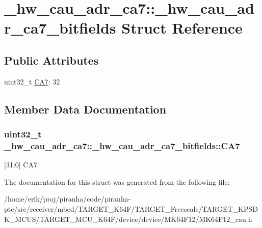 \hypertarget{struct__hw__cau__adr__ca7_1_1__hw__cau__adr__ca7__bitfields}{}\section{\+\_\+hw\+\_\+cau\+\_\+adr\+\_\+ca7\+:\+:\+\_\+hw\+\_\+cau\+\_\+adr\+\_\+ca7\+\_\+bitfields Struct Reference}
\label{struct__hw__cau__adr__ca7_1_1__hw__cau__adr__ca7__bitfields}
\subsection*{Public Attributes}
\begin{DoxyCompactItemize}
\item 
uint32\+\_\+t \hyperlink{struct__hw__cau__adr__ca7_1_1__hw__cau__adr__ca7__bitfields_a19b2b3afaafb951af5d09a3d51599964}{C\+A7}\+: 32
\end{DoxyCompactItemize}


\subsection{Member Data Documentation}
\subsubsection[{\texorpdfstring{C\+A7}{CA7}}]{\setlength{\rightskip}{0pt plus 5cm}uint32\+\_\+t \+\_\+hw\+\_\+cau\+\_\+adr\+\_\+ca7\+::\+\_\+hw\+\_\+cau\+\_\+adr\+\_\+ca7\+\_\+bitfields\+::\+C\+A7}\hypertarget{struct__hw__cau__adr__ca7_1_1__hw__cau__adr__ca7__bitfields_a19b2b3afaafb951af5d09a3d51599964}{}\label{struct__hw__cau__adr__ca7_1_1__hw__cau__adr__ca7__bitfields_a19b2b3afaafb951af5d09a3d51599964}
\mbox{[}31\+:0\mbox{]} C\+A7 

The documentation for this struct was generated from the following file\+:\begin{DoxyCompactItemize}
\item 
/home/erik/proj/piranha/code/piranha-\/ptc/src/receiver/mbed/\+T\+A\+R\+G\+E\+T\+\_\+\+K64\+F/\+T\+A\+R\+G\+E\+T\+\_\+\+Freescale/\+T\+A\+R\+G\+E\+T\+\_\+\+K\+P\+S\+D\+K\+\_\+\+M\+C\+U\+S/\+T\+A\+R\+G\+E\+T\+\_\+\+M\+C\+U\+\_\+\+K64\+F/device/device/\+M\+K64\+F12/M\+K64\+F12\+\_\+cau.\+h\end{DoxyCompactItemize}
